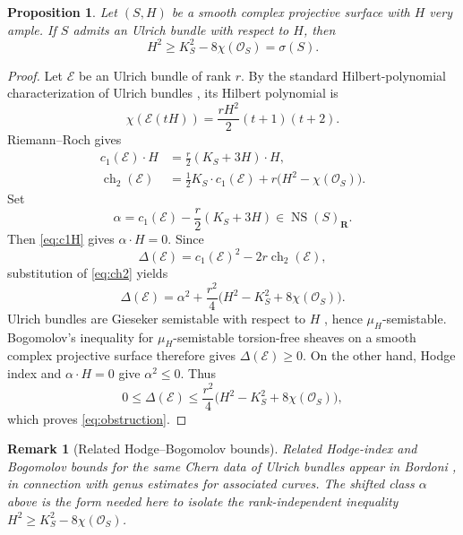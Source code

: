 \documentclass[11pt]{article}
\newtheorem{proposition}[theorem]{Proposition}
\newtheorem{remark}[theorem]{Remark}
\newcommand{\OO}{\mathcal O}
\newcommand{\cE}{\mathcal E}
\newcommand{\NS}{\operatorname{NS}}
\newcommand{\ch}{\operatorname{ch}}
\newcommand{\sig}{\sigma}
\begin{document}
\begin{proposition}\label{prop:obstruction}
Let $(S,H)$ be a smooth complex projective surface with $H$ very ample.  If
$S$ admits an Ulrich bundle with respect to $H$, then
\begin{equation}\label{eq:obstruction}
        H^2\ge K_S^2-8\chi(\OO_S)=\sig(S).
\end{equation}
\end{proposition}

\begin{proof}
Let $\cE$ be an Ulrich bundle of rank $r$.  By the standard Hilbert-polynomial
characterization of Ulrich bundles \cite[Proposition~2.1]{ESW}, its Hilbert polynomial is
\[
        \chi(\cE(tH))=\frac{rH^2}{2}(t+1)(t+2).
\]
Riemann--Roch gives
\begin{align}
 c_1(\cE)\cdot H&=\frac r2(K_S+3H)\cdot H,\label{eq:c1H}\\
 \ch_2(\cE)&=\frac12 K_S\cdot c_1(\cE)
             +r\bigl(H^2-\chi(\OO_S)\bigr).\label{eq:ch2}
\end{align}
Set
\[
        \alpha=c_1(\cE)-\frac r2(K_S+3H)\in\NS(S)_{\mathbf R}.
\]
Then \eqref{eq:c1H} gives $\alpha\cdot H=0$.  Since
\[
        \Delta(\cE)=c_1(\cE)^2-2r\ch_2(\cE),
\]
substitution of \eqref{eq:ch2} yields
\begin{equation}\label{eq:Delta-shifted}
 \Delta(\cE)=\alpha^2+\frac{r^2}{4}
 \bigl(H^2-K_S^2+8\chi(\OO_S)\bigr).
\end{equation}
Ulrich bundles are Gieseker semistable with respect to $H$
\cite[Theorem~2.9]{CH}, hence $\mu_H$-semistable.  Bogomolov's inequality for
$\mu_H$-semistable torsion-free sheaves on a smooth complex projective surface
\cite[Theorem~3.4.1]{HuybrechtsLehn} therefore gives
$\Delta(\cE)\ge0$.  On the other hand, Hodge index and $\alpha\cdot H=0$ give
$\alpha^2\le0$.  Thus
\[
 0\le\Delta(\cE)
 \le\frac{r^2}{4}
 \bigl(H^2-K_S^2+8\chi(\OO_S)\bigr),
\]
which proves \eqref{eq:obstruction}.
\end{proof}

\begin{remark}[Related Hodge--Bogomolov bounds]\label{rem:bordoni-bounds}
Related Hodge-index and Bogomolov bounds for the same Chern data of Ulrich
bundles appear in Bordoni \cite[Remark~4.1]{Bordoni2025}, in connection with
genus estimates for associated curves.  The shifted class $\alpha$ above is the
form needed here to isolate the rank-independent inequality
$H^2\ge K_S^2-8\chi(\OO_S)$.
\end{remark}
\end{document}
